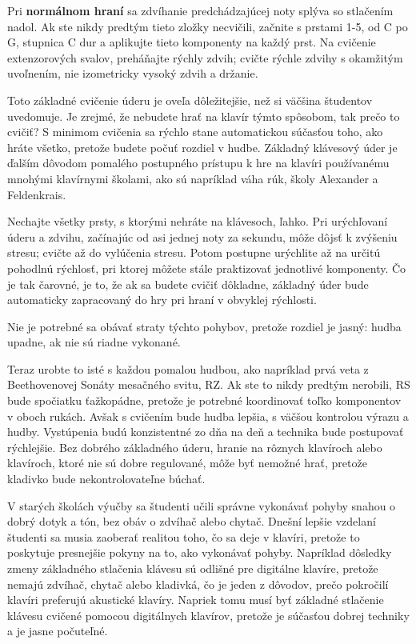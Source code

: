 \documentclass[11pt,a4paper]{book}
\begin{document}
Pri \textbf{normálnom hraní} sa zdvíhanie predchádzajúcej noty splýva so stlačením nadol. Ak ste nikdy predtým tieto zložky necvičili, začnite s prstami 1-5, od C po G, stupnica C dur a aplikujte tieto komponenty na každý prst. Na cvičenie extenzorových svalov, preháňajte rýchly zdvih; cvičte rýchle zdvihy s okamžitým uvoľnením, nie izometricky vysoký zdvih a držanie.

Toto základné cvičenie úderu je oveľa dôležitejšie, než si väčšina študentov uvedomuje. Je zrejmé, že nebudete hrať na klavír týmto spôsobom, tak prečo to cvičiť? S minimom cvičenia sa rýchlo stane automatickou súčasťou toho, ako hráte všetko, pretože budete počuť rozdiel v hudbe. Základný klávesový úder je ďalším dôvodom pomalého postupného prístupu k hre na klavíri používanému mnohými klavírnymi školami, ako sú napríklad váha rúk, školy Alexander a Feldenkrais.

Nechajte všetky prsty, s ktorými nehráte na klávesoch, ľahko. Pri urýchľovaní úderu a zdvihu, začínajúc od asi jednej noty za sekundu, môže dôjsť k zvýšeniu stresu; cvičte až do vylúčenia stresu. Potom postupne urýchlite až na určitú pohodlnú rýchlosť, pri ktorej môžete stále praktizovať jednotlivé komponenty. Čo je tak čarovné, je to, že ak sa budete cvičiť dôkladne, základný úder bude automaticky zapracovaný do hry pri hraní v obvyklej rýchlosti.

Nie je potrebné sa obávať straty týchto pohybov, pretože rozdiel je jasný: hudba upadne, ak nie sú riadne vykonané.

Teraz urobte to isté s každou pomalou hudbou, ako napríklad prvá veta z Beethovenovej Sonáty mesačného svitu, RZ. Ak ste to nikdy predtým nerobili, RS bude spočiatku ťažkopádne, pretože je potrebné koordinovať toľko komponentov v oboch rukách. Avšak s cvičením bude hudba lepšia, s väčšou kontrolou výrazu a hudby. Vystúpenia budú konzistentné zo dňa na deň a technika bude postupovať rýchlejšie. Bez dobrého základného úderu, hranie na rôznych klavíroch alebo klavíroch, ktoré nie sú dobre regulované, môže byť nemožné hrať, pretože kladivko bude nekontrolovateľne búchať.

V starých školách výučby sa študenti učili správne vykonávať pohyby snahou o dobrý dotyk a tón, bez obáv o zdvíhač alebo chytač. Dnešní lepšie vzdelaní študenti sa musia zaoberať realitou toho, čo sa deje v klavíri, pretože to poskytuje presnejšie pokyny na to, ako vykonávať pohyby. Napríklad dôsledky zmeny základného stlačenia klávesu sú odlišné pre digitálne klavíre, pretože nemajú zdvíhač, chytač alebo kladivká, čo je jeden z dôvodov, prečo pokročilí klavíri preferujú akustické klavíry. Napriek tomu musí byť základné stlačenie klávesu cvičené pomocou digitálnych klavírov, pretože je súčasťou dobrej techniky a je jasne počuteľné.
\end{document}
